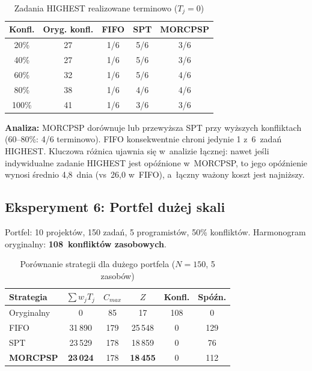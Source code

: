 \begin{table}[H]
\centering
\caption{Zadania HIGHEST realizowane terminowo ($T_j = 0$)}
\label{tab:exp5_critical}
\begin{tabular}{|c|c|c|c|c|}
\hline
\textbf{Konfl.} & \textbf{Oryg. konfl.} & \textbf{FIFO} & \textbf{SPT} & \textbf{MORCPSP} \\ \hline
20\% & 27 & 1/6 & 5/6 & 3/6 \\ \hline
40\% & 27 & 1/6 & 5/6 & 3/6 \\ \hline
60\% & 32 & 1/6 & 5/6 & 4/6 \\ \hline
80\% & 38 & 1/6 & 4/6 & 4/6 \\ \hline
100\% & 41 & 1/6 & 3/6 & 3/6 \\ \hline
\end{tabular}
\end{table}

\textbf{Analiza:} MORCPSP dorównuje lub przewyższa SPT przy wyższych konfliktach (60--80\%: 4/6 terminowo). FIFO konsekwentnie chroni jedynie 1 z~6~zadań HIGHEST. Kluczowa różnica ujawnia się w~analizie łącznej: nawet jeśli indywidualne zadanie HIGHEST jest opóźnione w~MORCPSP, to jego opóźnienie wynosi średnio 4{,}8~dnia (vs~26{,}0 w~FIFO), a~łączny ważony koszt jest najniższy.

\subsection{Eksperyment 6: Portfel dużej skali}

Portfel: 10 projektów, 150 zadań, 5 programistów, 50\% konfliktów. Harmonogram oryginalny: \textbf{108~konfliktów zasobowych}.

\begin{table}[H]
\centering
\caption{Porównanie strategii dla dużego portfela ($N=150$, 5 zasobów)}
\label{tab:exp6_large}
\begin{tabular}{|l|c|c|c|c|c|}
\hline
\textbf{Strategia} & $\sum w_j T_j$ & $C_{max}$ & $Z$ & \textbf{Konfl.} & \textbf{Spóźn.} \\ \hline
Oryginalny & 0 & 85 & 17 & 108 & 0 \\ \hline
FIFO & 31\,890 & 179 & 25\,548 & 0 & 129 \\ \hline
SPT & 23\,529 & 178 & 18\,859 & 0 & 76 \\ \hline
\textbf{MORCPSP} & \textbf{23\,024} & 178 & \textbf{18\,455} & 0 & 112 \\ \hline
\end{tabular}
\end{table}

